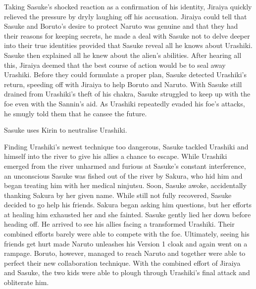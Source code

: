 \documentclass[a4paper,12pt]{article}
\begin{document}
Taking Sasuke's shocked reaction as a confirmation of his identity, Jiraiya quickly relieved the pressure by dryly laughing off his accusation. Jiraiya could tell that Sasuke and Boruto's desire to protect Naruto was genuine and that they had their reasons for keeping secrets, he made a deal with Sasuke not to delve deeper into their true identities provided that Sasuke reveal all he knows about Urashiki. Sasuke then explained all he knew about the alien's abilities. After hearing all this, Jiraiya deemed that the best course of action would be to seal away Urashiki. Before they could formulate a proper plan, Sasuke detected Urashiki's return, speeding off with Jiraiya to help Boruto and Naruto. With Sasuke still drained from Urashiki's theft of his chakra, Sasuke struggled to keep up with the foe even with the Sannin's aid. As Urashiki repeatedly evaded his foe's attacks, he smugly told them that he cansee the future.\\ \par \vspace{0.5cm}

Sasuke uses Kirin to neutralise Urashiki.\\ \par \vspace{0.5cm}

Finding Urashiki's newest technique too dangerous, Sasuke tackled Urashiki and himself into the river to give his allies a chance to escape. While Urashiki emerged from the river unharmed and furious at Sasuke's constant interference, an unconscious Sasuke was fished out of the river by Sakura, who hid him and began treating him with her medical ninjutsu. Soon, Sasuke awoke, accidentally thanking Sakura by her given name. While still not fully recovered, Sasuke decided to go help his friends. Sakura began asking him questions, but her efforts at healing him exhausted her and she fainted. Sasuke gently lied her down before heading off. He arrived to see his allies facing a transformed Urashiki. Their combined efforts barely were able to compete with the foe. Ultimately, seeing his friends get hurt made Naruto unleashes his Version 1 cloak and again went on a rampage. Boruto, however, managed to reach Naruto and together were able to perfect their new collaboration technique. With the combined effort of Jiraiya and Sasuke, the two kids were able to plough through Urashiki's final attack and obliterate him.\\ \par \vspace{0.5cm}
\end{document}
